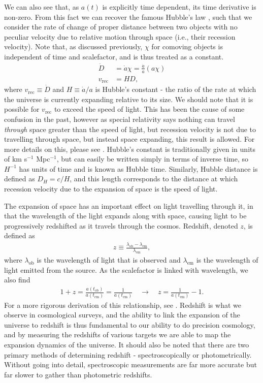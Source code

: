 \documentclass[titlesmallcaps, examinerscopy, copyrightpage]{uqthesis}
\begin{document}
We can also see that, as $a(t)$ is explicitly time dependent, its time derivative is non-zero. From this fact we can recover the famous Hubble's law \citep{Hubble1929}, such that we consider the rate of change of proper distance between two objects with no peculiar velocity due to relative motion through space (i.e., their recession velocity). Note that, as discussed previously, $\chi$ for comoving objects is independent of time and scalefactor, and is thus treated as a constant.
\begin{align}
\dot{D} &= \dot{a} \chi  = \frac{\dot{a}}{a} (a \chi)\\
v_{\text{rec}} &= H D,
\end{align}
where $v_{\text{rec}} \equiv \dot{D}$ and $H \equiv \dot{a}/a$ is Hubble's constant - the ratio of the rate at which the universe is currently expanding relative to its size. We should note that it is possible for $v_{\text{rec}}$ to exceed the speed of light. This has been the cause of some confusion in the past, however as special relativity says nothing can travel \textit{through} space greater than the speed of light, but recession velocity is not due to travelling through space, but instead space expanding, this result is allowed. For more details on this, please see \citet{DavisLineweaver2004}. Hubble's constant is traditionally given in units of km s$^{-1}$ Mpc$^{-1}$, but can easily be written simply in terms of inverse time, so $H^{-1}$ has units of time and is known as Hubble time. Similarly, Hubble distance is defined as $D_H = c/H$, and this length corresponds to the distance at which recession velocity due to the expansion of space is the speed of light.

The expansion of space has an important effect on light travelling through it, in that the wavelength of the light expands along with space, causing light to be progressively redshifted as it travels through the cosmos. Redshift, denoted $z$, is defined as 
\begin{align}
z \equiv \frac{\lambda_{\text{ob}} - \lambda_{\text{em}}}{\lambda_{\text{em}}},
\end{align}
where $\lambda_{\text{ob}}$ is the wavelength of light that is observed and $\lambda_{\text{em}}$ is the wavelength of light emitted from the source. As the scalefactor is linked with wavelength, we also find
\begin{align}
1 + z = \frac{a(t_{\text{ob}})}{a(t_{\text{em}})} = \frac{1}{a(t_{\text{em}})} \quad\rightarrow \quad z = \frac{1}{a(t_{\text{em}})} - 1.
\end{align}
For a more rigorous derivation of this relationship, see \citet[Ch 3.4]{RydenPartridge2004}. Redshift is what we observe in cosmological surveys, and the ability to link the expansion of the universe to redshift is thus fundamental to our ability to do precision cosmology, and by measuring the redshifts of various targets we are able to map the expansion dynamics of the universe. It should also be noted that there are two primary methods of determining redshift - spectroscopically or photometrically. Without going into detail, spectroscopic measurements are far more accurate but far slower to gather than photometric redshifts.
\end{document}
